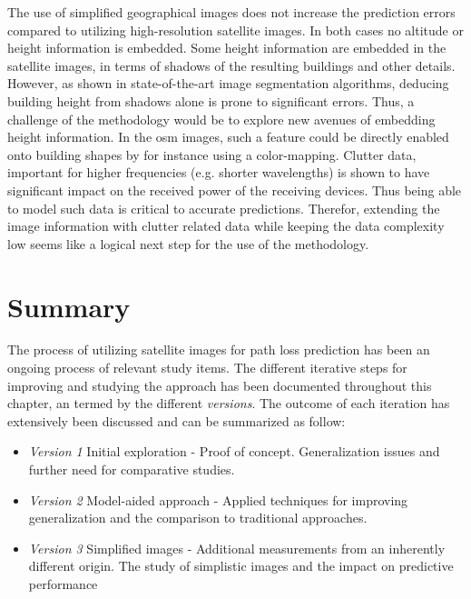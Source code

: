 The use of simplified geographical images does not increase the prediction errors compared to utilizing high-resolution satellite images. In both cases no altitude or height information is embedded. Some height information are embedded in the satellite images, in terms of shadows of the resulting buildings and other details. However, as shown in state-of-the-art image segmentation algorithms, deducing building height from shadows alone is prone to significant errors. Thus, a challenge of the methodology would be to explore new avenues of embedding height information. In the \gls{osm} images, such a feature could be directly enabled onto building shapes by for instance using a color-mapping. Clutter data, important for higher frequencies (e.g. shorter wavelengths) is shown to have significant impact on the received power of the receiving devices. Thus being able to model such data is critical to accurate predictions. Therefor, extending the image information with clutter related data while keeping the data complexity low seems like a logical next step for the use of the methodology.


\section{Summary}\label{sec:satellite_image_discussion}
The process of utilizing satellite images for path loss prediction has been an ongoing process of relevant study items. The different iterative steps for improving and studying the approach has been documented throughout this chapter, an termed by the different \emph{versions}. The outcome of each iteration has extensively been discussed and can be summarized as follow:
\begin{itemize}
    \item \emph{Version 1} Initial exploration - Proof of concept. Generalization issues and further need for comparative studies.
    \item \emph{Version 2} Model-aided approach - Applied techniques for improving generalization and the comparison to traditional approaches.
    \item \emph{Version 3} Simplified images - Additional measurements from an inherently different origin. The study of simplistic images and the impact on predictive performance
\end{itemize}




